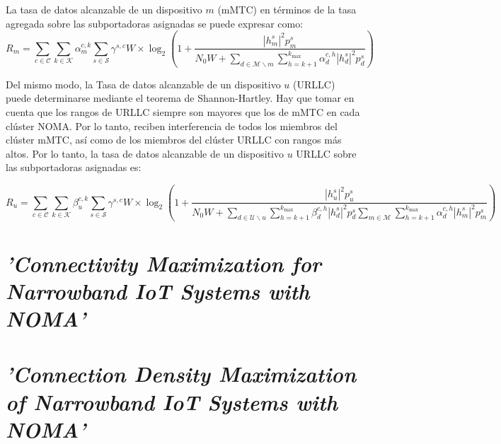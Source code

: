 La tasa de datos alcanzable de un dispositivo $m$ (mMTC) en términos de la tasa agregada sobre las subportadoras asignadas se puede expresar como:
\begin{equation}
{R_{m}}=\sum \limits _{c \in \mathcal {C}} {\sum \limits _{k \in \mathcal {K}} {\alpha _{m}^{c,k}\sum \limits _{s \in \mathcal {S}} {{\gamma ^{s,c}}W} } } \times {\log _{2}}\left ({{1 + \frac {{{{\left |{ {h_{m}^{s}} }\right |}^{2}}p_{m}^{s}}}{{N_{0}W + \sum \limits _{d \in \mathcal {M}\backslash m} {\sum \limits _{h = k + 1}^{{k_{\max }}} {\alpha _{d}^{c,h}{{\left |{ {h_{d}^{s}} }\right |}^{2}}p_{d}^{s}} } }}} }\right)
\label{eqn:Rm}
\end{equation}

Del mismo modo, la Tasa de datos alcanzable de un dispositivo $u$ (URLLC) puede determinarse mediante el teorema de Shannon-Hartley. Hay que tomar en cuenta que los rangos de URLLC siempre son mayores que los de mMTC en cada clúster NOMA. Por lo tanto, reciben interferencia de todos los miembros del clúster mMTC, así como de los miembros del clúster URLLC con rangos más altos. 
Por lo tanto, la tasa de datos alcanzable de un dispositivo $u$ URLLC sobre las subportadoras asignadas es:

\begin{equation}
{R_{u}}=\sum \limits _{c \in \mathcal {C}} {\sum \limits _{k \in \mathcal {K}} {\beta _{u}^{c,k}\sum \limits _{s \in \mathcal {S}} {{\gamma ^{s,c}}W} } } \times {\log _{2}}\left ({{1 + \frac {{{{\left |{ {h_{u}^{s}} }\right |}^{2}}p_{u}^{s}}}{{N_{0}W + \sum \limits _{d \in \mathcal {U}\backslash u} {\sum \limits _{h = k + 1}^{{k_{\max }}} {\beta _{d}^{c,h}{{\left |{ {h_{d}^{s}} }\right |}^{2}}p_{d}^{s}}} \sum \limits _{m \in \mathcal {M}} {\sum \limits _{h = k + 1}^{{k_{\max }}} {\alpha _{d}^{c,h}{{\left |{ {h_{m}^{s}} }\right |}^{2}}p_{m}^{s}} } }}} }\right)
\label{eqn:Ru}
\end{equation}


\section{\textit{'Connectivity Maximization for Narrowband IoT Systems with NOMA'}}


\section{\textit{'Connection Density Maximization of Narrowband IoT Systems with NOMA'}}


\newline